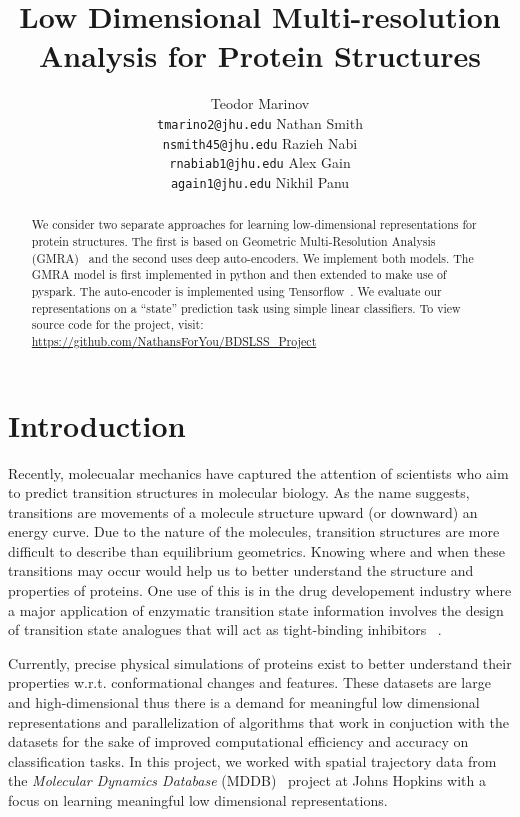 \documentclass{article}
\title{Low Dimensional Multi-resolution Analysis for Protein Structures}
\author{
  Teodor Marinov\\
  \texttt{tmarino2@jhu.edu} \And
  Nathan Smith\\
  \texttt{nsmith45@jhu.edu} \And
  Razieh Nabi\\
  \texttt{rnabiab1@jhu.edu} \And
  Alex Gain\\
  \texttt{again1@jhu.edu} \And
  Nikhil Panu\\
  \texttt{}
}
\begin{document}

\maketitle

\begin{abstract}
  We consider two separate approaches for learning low-dimensional representations for protein structures. The first is based on Geometric Multi-Resolution Analysis (GMRA)~\cite{allard2012multi} and the second uses deep auto-encoders. We implement both models. The GMRA model is first implemented in python and then extended to make use of pyspark. The auto-encoder is implemented using Tensorflow~\cite{abadi2016tensorflow}. We evaluate our representations on a ``state'' prediction task using simple linear classifiers. To view source code for the project, visit: \url{https://github.com/NathansForYou/BDSLSS_Project}
\end{abstract}

\section{Introduction}
Recently, molecualar mechanics have captured the attention of scientists who aim to predict transition structures in molecular biology. As the name suggests, transitions are movements of a molecule structure upward (or downward) an energy curve. Due to the nature of the molecules, transition structures are more difficult to describe than equilibrium geometrics. %
Knowing where and when these transitions may occur would help us to better understand the structure and properties of proteins. One use of this is in the drug developement industry where a major application of enzymatic transition state information involves the design of transition state analogues that will act as tight-binding inhibitors ~\cite{Schramm}. 

Currently, precise physical simulations of proteins exist to better understand their properties w.r.t. conformational changes and features. These datasets are large and high-dimensional thus there is a demand for meaningful low dimensional representations and parallelization of algorithms that work in conjuction with the datasets for the sake of improved computational efficiency and accuracy on classification tasks. In this project, we worked with spatial trajectory data from the \textit{Molecular Dynamics Database} (MDDB)~\cite{Nutanong:2013:AEL:2484838.2484872} project at Johns Hopkins with a focus on learning meaningful low dimensional representations.
\end{document}
